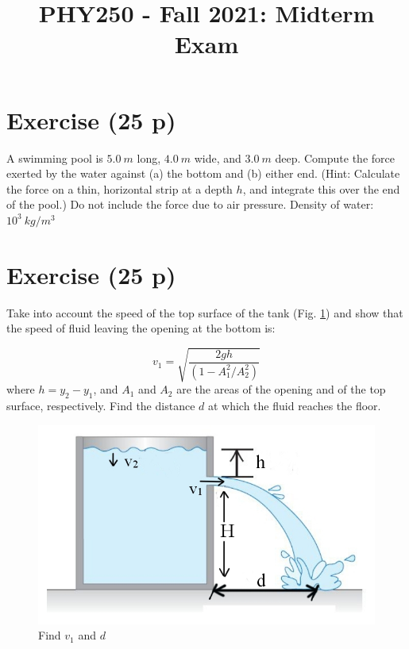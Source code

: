 \documentclass[12pt]{article}
\title{PHY250 - Fall 2021: Midterm Exam}
\author{}
\date{}
\begin{document}
\maketitle






\setcounter{example}{1}

\section*{Exercise \theexample (25 p)}



A swimming pool is $5.0~m$ long, $4.0~m$ wide, and
$3.0~m$ deep. Compute the force exerted by the water against (a) the
bottom and (b) either end. (Hint: Calculate the force on a thin, horizontal
strip at a depth $h$, and integrate this over the end of the
pool.) Do not include the force due to air pressure. Density of water: $10^3~kg/m^3$



\section*{Exercise \theexample (25 p)}

Take into account the speed of the top surface of the tank (Fig. \ref{image1}) and show that the speed of
fluid leaving the opening at the bottom is:

\begin{equation*}
  v_1=\sqrt{\frac{2gh}{(1-A^2_1/A^2_2)}}
\end{equation*}
where $h = y_2-y_1$, and $A_1$ and $A_2$ are the areas of the opening and of the top surface,
respectively. Find the distance $d$ at which the fluid reaches the floor.

\begin{figure}[h!]
  \begin{center}
    \includegraphics[height=2.in]{images/1.jpg}
  \end{center}
  \caption{Find $v_1$ and $d$}
  \label{image1}
\end{figure}
\end{document}
